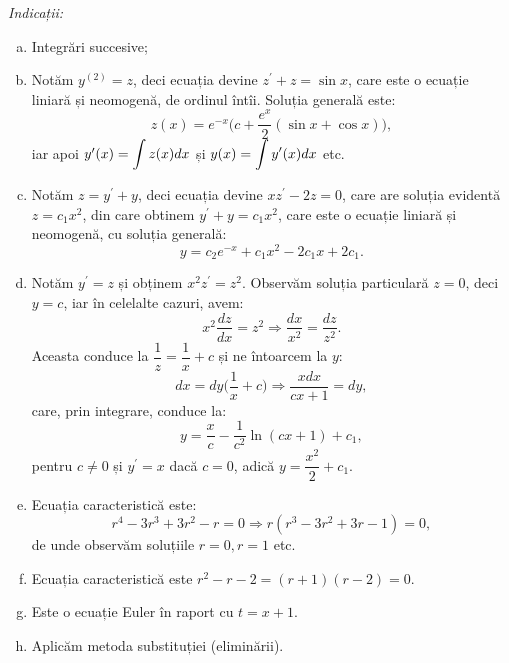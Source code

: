 \emph{Indicații:}
\begin{enumerate}[(a)]
  \item Integrări succesive;
  \item Notăm $ y^{(2)} = z $, deci ecuația devine $ z^\prime + z = \sin x $, care este
    o ecuație liniară și neomogenă, de ordinul întîi. Soluția generală este:
    \[
      z(x) = e^{-x}\Big( c + \dfrac{e^x}{2} (\sin x + \cos x) \Big),
    \]
    iar apoi $ y^\prime(x) = \displaystyle\int z(x) dx $ și $ y(x) = \displaystyle\int y^\prime (x) dx $ etc.
  \item Notăm $ z = y^\prime + y $, deci ecuația devine $ xz^\prime - 2z = 0 $, care
    are soluția evidentă $ z = c_1 x^2 $, din care obtinem $ y^\prime + y = c_1 x^2 $, care
    este o ecuație liniară și neomogenă, cu soluția generală:
    \[
      y = c_2 e^{-x} + c_1 x^2 - 2c_1 x + 2c_1.
    \]
  \item Notăm $ y^\prime = z $ și obținem $ x^2 z^\prime = z^2 $. Observăm soluția particulară
    $ z = 0 $, deci $ y = c $, iar în celelalte cazuri, avem:
    \[
      x^2 \dfrac{dz}{dx} = z^2 \Rightarrow \dfrac{dx}{x^2} = \dfrac{dz}{z^2}.
    \]
    Aceasta conduce la $ \dfrac{1}{z} = \dfrac{1}{x} + c $ și ne întoarcem
    la $ y $:
    \[
      dx = dy \Big( \dfrac{1}{x} + c \Big) \Rightarrow \dfrac{xdx}{cx + 1} = dy,
    \]
    care, prin integrare, conduce la:
    \[
      y = \dfrac{x}{c} - \dfrac{1}{c^2} \ln(cx + 1) + c_1,
    \]
    pentru $ c \neq 0 $ și $ y^\prime = x $ dacă $ c = 0 $, adică $ y = \dfrac{x^2}{2} + c_1 $.
  \item Ecuația caracteristică este:
    \[
      r^4 - 3r^3 + 3r^2 - r = 0 \Rightarrow r(r^3 - 3r^2 + 3r - 1) = 0,
    \]
    de unde observăm soluțiile $ r = 0, r = 1 $ etc.
  \item Ecuația caracteristică este $ r^2 - r - 2 = (r + 1)(r - 2) = 0 $.
  \item Este o ecuație Euler în raport cu $ t = x + 1 $.
  \item Aplicăm metoda substituției (eliminării).
\end{enumerate}


